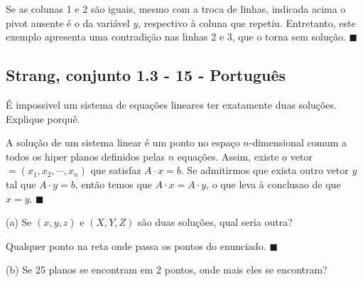 \documentclass[12pt,a4paper]{article}
\newcommand{\qed}{\hfill $\blacksquare$}
\begin{document}
Se as colunas 1 e 2 são iguais, mesmo com a troca de linhas, indicada acima o pivot ausente é o da variável $ y $, respectivo à coluna que repetiu. Entretanto, este exemplo apresenta uma contradição nas linhas 2 e 3, que o torna sem solução.
\qed

\subsection*{Strang, conjunto 1.3 - 15 - Português}
É impossivel um sistema de equações lineares ter exatamente duas soluções. Explique porquê.

A solução de um sistema linear é um ponto no espaço $ n $-dimensional comum a todos os hiper planos definidos pelas $ n $ equações. Assim, existe o vetor $ = (x_1,x_2,\cdots,x_n) $ que satisfaz $ A\cdot x = b $. Se admitirmos que exista outro vetor $ y $ tal que $ A \cdot y = b $, então temos que $ A\cdot x = A \cdot y $, o que leva à conclusao de que $ x = y $. 
\qed

(a) Se $ (x,y,z) $ e $ (X,Y,Z) $ são duas soluções, qual seria outra?

Qualquer ponto na reta onde passa os pontos do enunciado.
\qed

(b) Se 25 planos se encontram em 2 pontos, onde mais eles se encontram?
\end{document}
